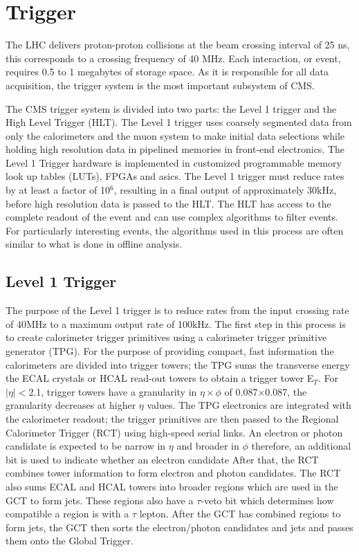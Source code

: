 \section{Trigger}
The LHC delivers proton-proton collisions at the beam crossing 
interval of 25 ns, this corresponds to a crossing frequency of 40 MHz.
Each interaction, or event, requires 0.5 to 1 megabytes of storage space.
As it is responsible for all data acquisition, %
the trigger system is the most important subsystem of CMS. 

The CMS trigger system is divided into two parts: the Level 1 trigger 
and the High Level Trigger (HLT). 
The Level 1 trigger uses coarsely segmented
data from only the calorimeters and the muon system to make initial
data selections while holding high resolution data in pipelined memories
in front-end electronics. The Level 1 Trigger hardware is implemented in customized
programmable memory look up tables (LUTs), FPGAs and asics.
The Level 1 trigger must reduce rates by at least a factor of 10$^{6}$, 
resulting in a final output of approximately 30kHz,
before high resolution data is passed to the HLT.
The HLT has access to the complete readout of the event and can use
complex algorithms to filter events. For particularly interesting events, 
the algorithms used in this process are often similar to what is done in 
offline analysis. 
  \subsection{Level 1 Trigger}
The purpose of the Level 1 trigger is to reduce rates from the input
crossing rate of 40MHz to a maximum output rate of 100kHz. 
The first step in this process is to create
calorimeter trigger primitives using a calorimeter trigger primitive generator (TPG).
For the purpose of providing compact, fast information the calorimeters
are divided into trigger towers; the TPG sums the transverse energy the
ECAL crystals or HCAL read-out towers to obtain a trigger tower E$_{T}$.
For $|\eta|<$2.1, trigger towers have a granularity
in $\eta \times \phi$ of 0.087$\times$0.087, the granularity decreases at higher
$\eta$ values. 
The TPG electronics are integrated with the calorimeter readout; the trigger primitives
are then passed to the Regional Calorimeter Trigger (RCT) using
high-speed serial links.
An electron or photon candidate is expected to be narrow in $\eta$
and broader in $\phi$ therefore, an additional bit is used to indicate whether 
an electron candidate  
After that, the RCT combines tower information to form electron and 
photon candidates. The RCT also sums ECAL and HCAL towers into broader
regions which are used in the GCT to form jets. These regions also have a 
$\tau$-veto bit which determines how compatible a region is with a
$\tau$ lepton. After the GCT has combined regions to form jets, the GCT
then sorts the electron/photon candidates and jets and passes them onto
the Global Trigger.

